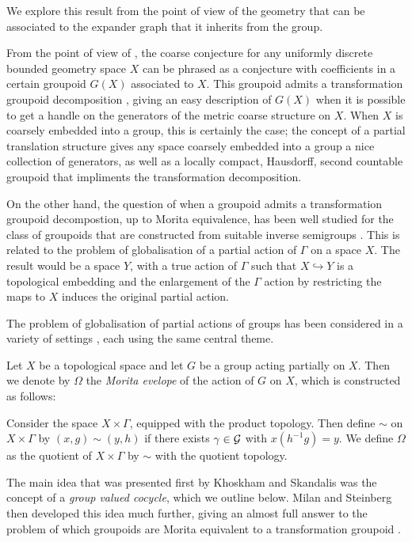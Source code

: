 We explore this result from the point of view of the geometry that can be associated to the expander graph that it inherits from the group.

From the point of view of \cite{MR1905840}, the coarse conjecture for any uniformly discrete bounded geometry space $X$ can be phrased as a conjecture with coefficients in a certain groupoid $G(X)$ associated to $X$. This groupoid admits a transformation groupoid decomposition \cite[Lemma 3.3b)]{MR1905840}, giving an easy description of $G(X)$ when it is possible to get a handle on the generators of the metric coarse structure on $X$. When $X$ is coarsely embedded into a group, this is certainly the case; the concept of a partial translation structure \cite{MR2363428} gives any space coarsely embedded into a group a nice collection of generators, as well as a locally compact, Hausdorff, second countable \etale groupoid that impliments the transformation decomposition.

On the other hand, the question of when a groupoid admits a transformation groupoid decompostion, up to Morita equivalence, has been well studied for the class of groupoids that are constructed from suitable inverse semigroups \cite{MR1900993,Milan-Steinberg}. This is related to the problem of globalisation of a partial action of $\Gamma$ on a space $X$. The result would be a space $Y$, with a true action of $\Gamma$ such that $X \hookrightarrow Y$ is a topological embedding and the enlargement of the $\Gamma$ action by restricting the maps to $X$ induces the original partial action.

The problem of globalisation of partial actions of groups has been considered in a variety of settings \cite{MR0160848, MR1798993, MR2041539, MR2419858, MR1900993, Milan-Steinberg}, each using the same central theme.

\begin{definition}
Let $X$ be a topological space and let $G$ be a group acting partially on $X$. Then we denote by $\Omega$ the \textit{Morita evelope} of the action of $G$ on $X$, which is constructed as follows:

Consider the space $X\times \Gamma$, equipped with the product topology. Then define $\sim$ on $X\times \Gamma$ by $(x,g)\sim (y,h)$ if there exists $\gamma \in \mathcal{G}$ with $x(h^{-1}g)=y$. We define $\Omega$ as the quotient of $X\times \Gamma$ by $\sim$ with the quotient topology. 
\end{definition}

The main idea that was presented first by Khoskham and Skandalis \cite{MR1900993} was the concept of a \textit{group valued cocycle}, which we outline below. Milan and Steinberg then developed this idea much further, giving an almost full answer to the problem of which groupoids are Morita equivalent to a transformation groupoid \cite{Milan-Steinberg}.

